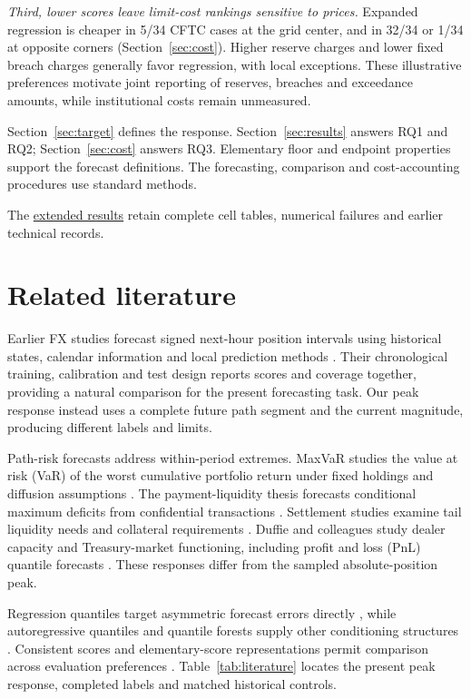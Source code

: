 \documentclass{rQUF2e}
\begin{document}
\textit{Third, lower scores leave limit-cost rankings sensitive to prices.} Expanded regression is cheaper in 5/34 CFTC cases at the grid center, and in 32/34 or 1/34 at opposite corners (Section~\ref{sec:cost}). Higher reserve charges and lower fixed breach charges generally favor regression, with local exceptions. These illustrative preferences motivate joint reporting of reserves, breaches and exceedance amounts, while institutional costs remain unmeasured.

Section~\ref{sec:target} defines the response. Section~\ref{sec:results} answers RQ1 and RQ2; Section~\ref{sec:cost} answers RQ3. Elementary floor and endpoint properties support the forecast definitions. The forecasting, comparison and cost-accounting procedures use standard methods.

\FloatBarrier

The \href{https://github.com/ByronLi0207/financial-mathematics-paper-20261020/blob/submission-final/EXTENDED_RESULTS.md}{extended results} retain complete cell tables, numerical failures and earlier technical records.

\section{Related literature}\label{sec:literature}

Earlier FX studies forecast signed next-hour position intervals using historical states, calendar information and local prediction methods \citep{wisniewski2020,wisniewski2024}. Their chronological training, calibration and test design reports scores and coverage together, providing a natural comparison for the present forecasting task. Our peak response instead uses a complete future path segment and the current magnitude, producing different labels and limits.


Path-risk forecasts address within-period extremes. MaxVaR studies the value at risk (VaR) of the worst cumulative portfolio return under fixed holdings and diffusion assumptions \citep{boudoukh2004}. The payment-liquidity thesis forecasts conditional maximum deficits from confidential transactions \citep{hoogen2017}. Settlement studies examine tail liquidity needs and collateral requirements \citep{petrunia2019,arjani2020}. Duffie and colleagues study dealer capacity and Treasury-market functioning, including profit and loss (PnL) quantile forecasts \citep{duffie2023}. These responses differ from the sampled absolute-position peak.


Regression quantiles target asymmetric forecast errors directly \citep{koenker1978}, while autoregressive quantiles and quantile forests supply other conditioning structures \citep{engle2004,meinshausen2006}. Consistent scores and elementary-score representations permit comparison across evaluation preferences \citep{gneiting2011,ehm2016}. Table~\ref{tab:literature} locates the present peak response, completed labels and matched historical controls.
\end{document}
